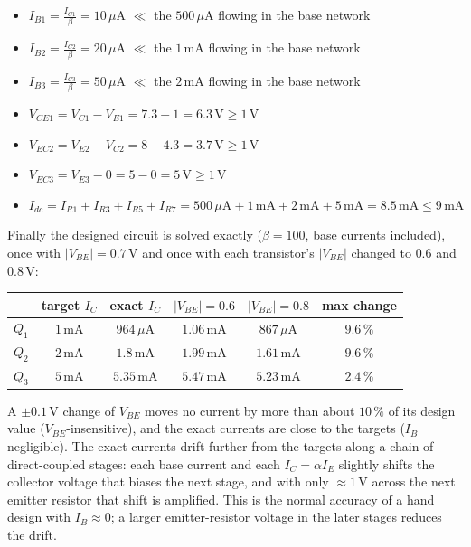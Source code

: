 \documentclass[11pt]{article}
\newcommand{\solstep}[2]{\par\medskip{\color{stepc}\textbf{Step #1 --- #2}}\par\nopagebreak}
\begin{document}
\solstep{4}{Check the design}\begin{itemize}[leftmargin=*,itemsep=2pt]
\item $I_{B1} = \frac{I_{C1}}{\beta} = 10\,\mu \mathrm{A}$ $\ll$ the $500\,\mu \mathrm{A}$ flowing in the base network \checkmark
\item $I_{B2} = \frac{I_{C2}}{\beta} = 20\,\mu \mathrm{A}$ $\ll$ the $1\,\mathrm{m}\mathrm{A}$ flowing in the base network \checkmark
\item $I_{B3} = \frac{I_{C3}}{\beta} = 50\,\mu \mathrm{A}$ $\ll$ the $2\,\mathrm{m}\mathrm{A}$ flowing in the base network \checkmark
\item $V_{CE1} = V_{C1} - V_{E1} = 7.3 - 1 = 6.3\,\mathrm{V} \ge 1$\,V \checkmark
\item $V_{EC2} = V_{E2} - V_{C2} = 8 - 4.3 = 3.7\,\mathrm{V} \ge 1$\,V \checkmark
\item $V_{EC3} = V_{E3} - 0 = 5 - 0 = 5\,\mathrm{V} \ge 1$\,V \checkmark
\item $I_{dc} = I_{R1} + I_{R3} + I_{R5} + I_{R7} = 500\,\mu \mathrm{A} + 1\,\mathrm{m}\mathrm{A} + 2\,\mathrm{m}\mathrm{A} + 5\,\mathrm{m}\mathrm{A} = 8.5\,\mathrm{m}\mathrm{A} \le 9\,\mathrm{m}\mathrm{A}$ \checkmark
\end{itemize}
Finally the designed circuit is solved exactly ($\beta=100$, base currents included), once with $|V_{BE}|=0.7$\,V and once with each transistor's $|V_{BE}|$ changed to $0.6$ and $0.8$\,V:\begin{center}\renewcommand{\arraystretch}{1.35}
\begin{tabular}{cccccc}
\toprule
 & target $I_C$ & exact $I_C$ & $|V_{BE}|=0.6$ & $|V_{BE}|=0.8$ & max change \\
\midrule
$Q_{1}$ & $1\,\mathrm{m}\mathrm{A}$ & $964\,\mu \mathrm{A}$ & $1.06\,\mathrm{m}\mathrm{A}$ & $867\,\mu \mathrm{A}$ & $9.6\,\%$ \\
$Q_{2}$ & $2\,\mathrm{m}\mathrm{A}$ & $1.8\,\mathrm{m}\mathrm{A}$ & $1.99\,\mathrm{m}\mathrm{A}$ & $1.61\,\mathrm{m}\mathrm{A}$ & $9.6\,\%$ \\
$Q_{3}$ & $5\,\mathrm{m}\mathrm{A}$ & $5.35\,\mathrm{m}\mathrm{A}$ & $5.47\,\mathrm{m}\mathrm{A}$ & $5.23\,\mathrm{m}\mathrm{A}$ & $2.4\,\%$ \\
\bottomrule
\end{tabular}\end{center}
A $\pm0.1$\,V change of $V_{BE}$ moves no current by more than about $10\,\%$ of its design value ($V_{BE}$-insensitive), and the exact currents are close to the targets ($I_B$ negligible). The exact currents drift further from the targets along a chain of direct-coupled stages: each base current and each $I_C = \alpha I_E$ slightly shifts the collector voltage that biases the next stage, and with only $\approx1$\,V across the next emitter resistor that shift is amplified. This is the normal accuracy of a hand design with $I_B\approx0$; a larger emitter-resistor voltage in the later stages reduces the drift.
\end{document}
